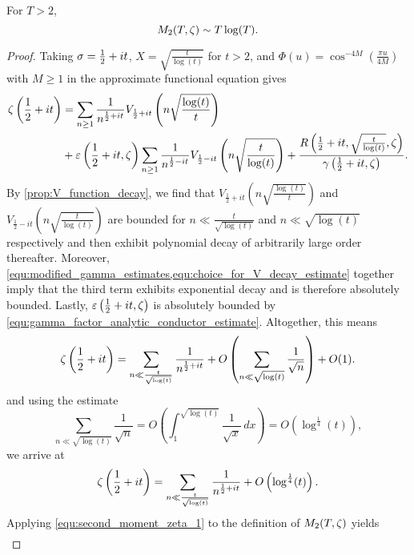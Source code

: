     \begin{theorem}
      For $T > 2$,
      \[
        M_{2}(T,\zeta) \sim T\log(T).
      \]
    \end{theorem}
    \begin{proof}
      Taking $\sigma = \frac{1}{2}+it$, $X = \sqrt{\frac{t}{\log(t)}}$ for $t > 2$, and $\Phi(u) = \cos^{-4M}\left(\frac{\pi u}{4M}\right)$ with $M \ge 1$ in the approximate functional equation gives
      \begin{align*}
        \zeta\left(\frac{1}{2}+it\right) &= \sum_{n \ge 1}\frac{1}{n^{\frac{1}{2}+it}}V_{\frac{1}{2}+it}\left(n\sqrt{\frac{\log(t)}{t}}\right) \\
        &+ \varepsilon\left(\frac{1}{2}+it,\zeta\right)\sum_{n \ge 1}\frac{1}{n^{\frac{1}{2}-it}}V_{\frac{1}{2}-it}\left(n\sqrt{\frac{t}{\log(t)}}\right)+\frac{R\left(\frac{1}{2}+it,\sqrt{\frac{t}{\log(t)}},\zeta\right)}{\gamma\left(\frac{1}{2}+it,\zeta\right)}.
      \end{align*}
      By \cref{prop:V_function_decay}, we find that $V_{\frac{1}{2}+it}\left(n\sqrt{\frac{\log(t)}{t}}\right)$ and $V_{\frac{1}{2}-it}\left(n\sqrt{\frac{t}{\log(t)}}\right)$ are bounded for $n \ll \frac{t}{\sqrt{\log(t)}}$ and $n \ll \sqrt{\log(t)}$ respectively and then exhibit polynomial decay of arbitrarily large order thereafter. Moreover, \cref{equ:modified_gamma_estimates,equ:choice_for_V_decay_estimate} together imply that the third term exhibits exponential decay and is therefore absolutely bounded. Lastly, $\varepsilon\left(\frac{1}{2}+it,\zeta\right)$ is absolutely bounded by \cref{equ:gamma_factor_analytic_conductor_estimate}. Altogether, this means
      \[
        \zeta\left(\frac{1}{2}+it\right) = \sum_{n \ll \frac{t}{\sqrt{\log(t)}}}\frac{1}{n^{\frac{1}{2}+it}}+O\left(\sum_{n \ll \sqrt{\log(t)}}\frac{1}{\sqrt{n}}\right)+O(1).
      \]
      and using the estimate
      \[
        \sum_{n \ll \sqrt{\log(t)}}\frac{1}{\sqrt{n}} = O\left(\int_{1}^{\sqrt{\log(t)}}\frac{1}{\sqrt{x}}\,dx\right) = O\left(\log^{\frac{1}{4}}(t)\right),
      \]
      we arrive at
      \begin{equation}\label{equ:second_moment_zeta_1}
        \zeta\left(\frac{1}{2}+it\right) = \sum_{n \ll \frac{t}{\sqrt{\log(t)}}}\frac{1}{n^{\frac{1}{2}+it}}+O\left(\log^{\frac{1}{4}}(t)\right).
      \end{equation}
      Applying \cref{equ:second_moment_zeta_1} to the definition of $M_{2}(T,\zeta)$ yields
      \begin{equation}\label{equ:second_moment_zeta_2}
        \begin{aligned}

\end{aligned}
\end{equation}
\end{proof}
